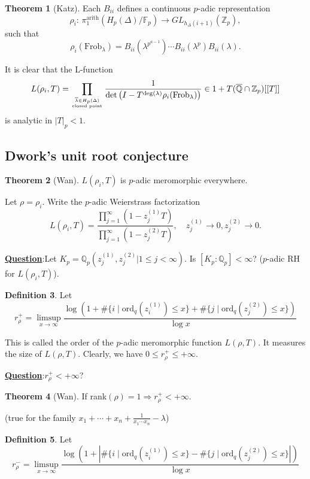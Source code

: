 \documentclass[a4paper,oneside,11pt]{article}
\theoremstyle{plain} \theoremstyle{definition}
\newtheorem{Thm}{Theorem}[section]
\newtheorem{Defn}[Thm]{Definition}
\theoremstyle{remark}
\newcommand{\Z}{\mathbb{Z}}
\newcommand{\Q}{\mathbb{Q}}
\newcommand{\f}{\mathbb{F}}
\begin{document}
\begin{Thm}[Katz] Each $B_{ii}$ defines a continuous $p$-adic representation
$$\rho_i:\, \pi_1^{\text{arith}}(H_p(\Delta)/\f_p)\longrightarrow
GL_{h_{\Delta}(i+1)}(\Z_p),$$
such that 
$$\rho_i(\text{Frob}_\lambda)=B_{ii}(\lambda^{p^{a-1}})\cdots
B_{ii}(\lambda^p)B_{ii}(\lambda).$$ 
\end{Thm}
It is clear that the L-function 
$$L(\rho_i, T)=\prod_{\overline{\lambda}\in
H_p(\Delta)\atop{\text{closed
point}}}\frac{1}{\det\left(I-T^{\deg(\lambda)}
\rho_i(\text{Frob}_\lambda)\right)}\in
1+T(\overline{\Q}\cap\Z_p)[[T]]$$ is analytic in $|T|_p<1$.

\subsection{Dwork's unit root conjecture}

\begin{Thm}[Wan] $L(\rho_i, T)$ is $p$-adic meromorphic everywhere.
\end{Thm}

Let $\rho=\rho_i$. Write the $p$-adic Weierstrass factorization
$$ L(\rho_i,
T)=\frac{\prod_{j=1}^\infty(1-z_j^{(1)}T)}
{\prod_{j=1}^\infty(1-z_j^{(2)}T)},\quad z_j^{(1)}\rightarrow
0,z_j^{(2)}\rightarrow 0.$$

\underline{\bf Question}:\quad Let $K_p=\Q_p(z_j^{(1)},
z_j^{(2)} | 1\leq j <\infty)$.  Is $[K_p: \Q_p]<\infty$? ($p$-adic RH for $L(\rho_i,
T)$).

\begin{Defn} Let $$r_\rho^+=\limsup_{x\rightarrow\infty}
\frac{\log(1+ \#\{i\mid\text{ord}_q(z_i^{(1)})\le
x\}+\#\{j\mid\text{ord}_q(z_j^{(2)})\le x\})}{\log x}$$
\end{Defn}

This is called the order of the $p$-adic meromorphic function $L(\rho, T)$.
It measures the size of $L(\rho, T)$. Clearly, we have $0\le r_\rho^+\le +\infty$.

\medskip
\underline{\bf Question}:\quad $r_\rho^+< +\infty$?


\begin{Thm}[Wan] If rank$(\rho)=1\Rightarrow r_{\rho}^+< +\infty$.
\end{Thm}
(true for the family $x_1+\cdots +x_n +\frac{1}{x_1\cdots x_n} -\lambda$)

\begin{Defn} Let $$r_\rho^-=\limsup_{x\rightarrow\infty}
\frac{ \log(1+ |\#\{i\mid\text{ord}_q(z_i^{(1)})\le
x\}-\#\{j\mid\text{ord}_q(z_j^{(2)})\le x\}|)}{\log x}$$
\end{Defn}
\end{document}
